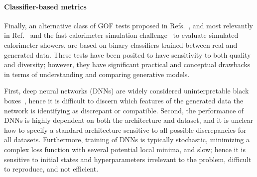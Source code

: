 \paragraph{Classifier-based metrics}

Finally, an alternative class of GOF tests proposed in Refs.~\cite{friedman_gof, lopez_paz_c2st, liu_deepkernels}, and most relevantly in Ref.~\cite{krause_caloflow} and the fast calorimeter simulation challenge~\cite{calochallenge} to evaluate simulated calorimeter showers, are based on binary classifiers trained between real and generated data.
These tests have been posited to have sensitivity to both quality and diversity; however, they have significant practical and conceptual drawbacks in terms of understanding and comparing generative models. 

First, deep neural networks (DNNs) are widely considered uninterpretable black boxes~\cite{black_box}, hence it is difficult to discern which features of the generated data the network is identifying as discrepant or compatible.
Second, the performance of DNNs is highly dependent on both the architecture and dataset, and it is unclear how to specify a standard architecture sensitive to all possible discrepancies for all datasets.
Furthermore, training of DNNs is typically stochastic, minimizing a complex loss function with several potential local minima, and slow; hence it is sensitive to initial states and hyperparameters irrelevant to the problem, difficult to reproduce, and not efficient.

